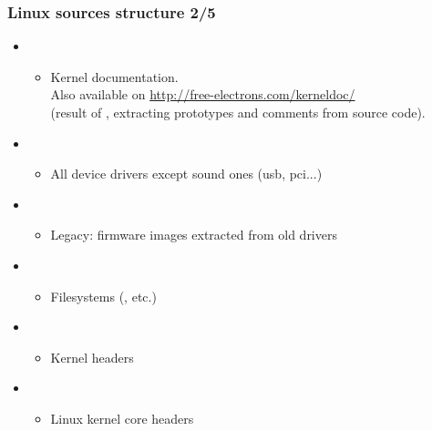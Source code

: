 \begin{frame}
  \frametitle{Linux sources structure 2/5}
  \begin{itemize}
  \item {}
    \begin{itemize}
    \item Kernel documentation.\\
     Also available on \url{http://free-electrons.com/kerneldoc/}\\
     (result of , extracting prototypes and comments
     from source code). 
    \end{itemize}
  \item {}
    \begin{itemize}
    \item All device drivers except sound ones (usb, pci...)
    \end{itemize}
  \item {}
    \begin{itemize}
    \item Legacy: firmware images extracted from old drivers
    \end{itemize}
  \item {}
    \begin{itemize}
    \item Filesystems (, etc.)
    \end{itemize}
  \item {}
    \begin{itemize}
    \item Kernel headers
    \end{itemize}
  \item {}
    \begin{itemize}
    \item Linux kernel core headers
    \end{itemize}
  \end{itemize}
\end{frame}


